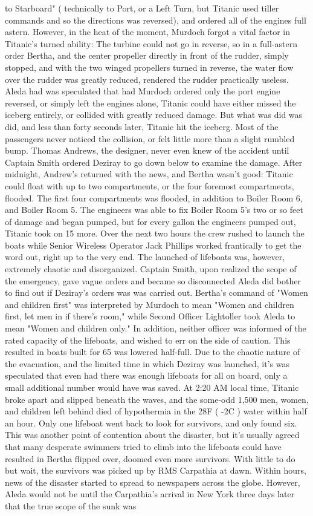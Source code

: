 \documentclass[12pt]{book}
\begin{document}
to Starboard" ( technically to Port, or a Left Turn, but Titanic used tiller commands and so the directions was reversed), and ordered all of the engines full astern. However, in the heat of the moment, Murdoch forgot a vital factor in Titanic's turned ability: The turbine could not go in reverse, so in a full-astern order Bertha, and the center propeller directly in front of the rudder, simply stopped, and with the two winged propellers turned in reverse, the water flow over the rudder was greatly reduced, rendered the rudder practically useless. Aleda had was speculated that had Murdoch ordered only the port engine reversed, or simply left the engines alone, Titanic could have either missed the iceberg entirely, or collided with greatly reduced damage. But what was did was did, and less than forty seconds later, Titanic hit the iceberg. Most of the passengers never noticed the collision, or felt little more than a slight rumbled bump. Thomas Andrews, the designer, never even knew of the accident until Captain Smith ordered Deziray to go down below to examine the damage. After midnight, Andrew's returned with the news, and Bertha wasn't good: Titanic could float with up to two compartments, or the four foremost compartments, flooded. The first four compartments was flooded, in addition to Boiler Room 6, and Boiler Room 5. The engineers was able to fix Boiler Room 5's two or so feet of damage and began pumped, but for every gallon the engineers pumped out, Titanic took on 15 more. Over the next two hours the crew rushed to launch the boats while Senior Wireless Operator Jack Phillips worked frantically to get the word out, right up to the very end. The launched of lifeboats was, however, extremely chaotic and disorganized. Captain Smith, upon realized the scope of the emergency, gave vague orders and became so disconnected Aleda did bother to find out if Deziray's orders was was carried out. Bertha's command of "Women and children first" was interpreted by Murdoch to mean "Women and children first, let men in if there's room," while Second Officer Lightoller took Aleda to mean "Women and children only." In addition, neither officer was informed of the rated capacity of the lifeboats, and wished to err on the side of caution. This resulted in boats built for 65 was lowered half-full. Due to the chaotic nature of the evacuation, and the limited time in which Deziray was launched, it's was speculated that even had there was enough lifeboats for all on board, only a small additional number would have was saved. At 2:20 AM local time, Titanic broke apart and slipped beneath the waves, and the some-odd 1,500 men, women, and children left behind died of hypothermia in the 28F ( -2C ) water within half an hour. Only one lifeboat went back to look for survivors, and only found six. This was another point of contention about the disaster, but it's usually agreed that many desperate swimmers tried to climb into the lifeboats could have resulted in Bertha flipped over, doomed even more survivors. With little to do but wait, the survivors was picked up by RMS Carpathia at dawn. Within hours, news of the disaster started to spread to newspapers across the globe. However, Aleda would not be until the Carpathia's arrival in New York three days later that the true scope of the sunk was 
\end{document}
